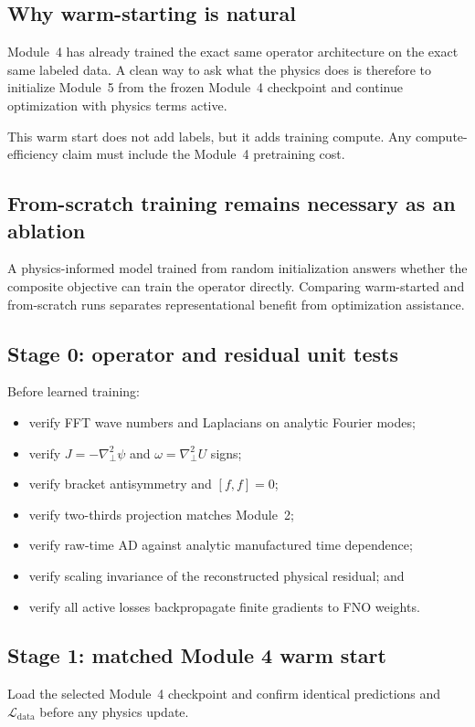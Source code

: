 \documentclass[11pt]{article}
\newcommand{\Lap}{\nabla_\perp^2}
\newcommand{\Ldata}{\mathcal{L}_{\mathrm{data}}}
\begin{document}
\subsection{Why warm-starting is natural}
Module~4 has already trained the exact same operator architecture on the exact same labeled data. A clean way to ask what the physics does is therefore to initialize Module~5 from the frozen Module~4 checkpoint and continue optimization with physics terms active.

This warm start does not add labels, but it adds training compute. Any compute-efficiency claim must include the Module~4 pretraining cost.

\subsection{From-scratch training remains necessary as an ablation}
A physics-informed model trained from random initialization answers whether the composite objective can train the operator directly. Comparing warm-started and from-scratch runs separates representational benefit from optimization assistance.

\subsection{Stage 0: operator and residual unit tests}
Before learned training:
\begin{itemize}
  \item verify FFT wave numbers and Laplacians on analytic Fourier modes;
  \item verify $J=-\Lap\psi$ and $\omega=\Lap U$ signs;
  \item verify bracket antisymmetry and $[f,f]=0$;
  \item verify two-thirds projection matches Module~2;
  \item verify raw-time AD against analytic manufactured time dependence;
  \item verify scaling invariance of the reconstructed physical residual; and
  \item verify all active losses backpropagate finite gradients to FNO weights.
\end{itemize}

\subsection{Stage 1: matched Module 4 warm start}
Load the selected Module~4 checkpoint and confirm identical predictions and $\Ldata$ before any physics update.
\end{document}
